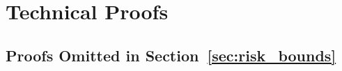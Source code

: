 \documentclass[letterpaper]{article} %
\newcommand{\pair}[1]{(#1)}
\newcommand{\bmlambda}{\bm{\lambda}}
\newcommand{\red}[1]{\textcolor{red}{#1}}
\newcommand{\todo}[1]{\red{\textsc{todo:} #1}}
\begin{document}


\section{Technical Proofs} %
\label{sec:technical_proofs}

\subsection{Proofs Omitted in Section~\ref{sec:risk_bounds}} %
\label{sub:proofs_omitted_in_section_sec:risk_bounds}
\end{document}
